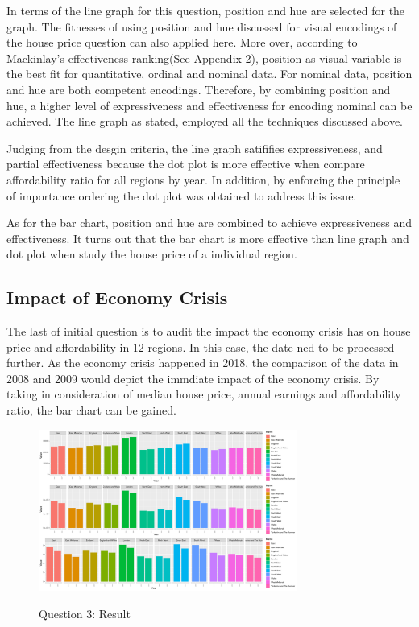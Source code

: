 \documentclass{article}
\begin{document}
In terms of the line graph for this question, position and hue are selected for the graph. The fitnesses of 
using position and hue discussed for visual encodings of the house price question can also applied here. 
More over, according to Mackinlay's effectiveness ranking(See Appendix 2)\cite{MackinlayJock1986Atdo}, 
position as visual variable is the best fit for quantitative, ordinal and nominal data. For nominal data, 
position and hue are both competent encodings. Therefore, by combining position and hue, a higher level of 
expressiveness and effectiveness for encoding nominal can be achieved. The line graph as stated, employed 
all the techniques discussed above. 

Judging from the desgin criteria, the line graph satififies expressiveness, and partial effectiveness because 
the dot plot is more effective when compare affordability ratio for all regions by year. In addition, by enforcing 
the principle of importance ordering the dot plot was obtained to address this issue.

As for the bar chart, position and hue are combined to achieve expressiveness and effectiveness. It turns out 
that the bar chart is more effective than line graph and dot plot when study the house price of a individual region.


\subsection{Impact of Economy Crisis}
The last of initial question is to audit the impact the economy crisis has on house price and affordability
in 12 regions. In this case, the date ned to be processed further. As the economy crisis happened in 2018, 
the comparison of the data in 2008 and 2009 would depict the immdiate impact of the economy crisis. By taking 
in consideration of median house price, annual earnings and affordability ratio, the bar chart can be gained.

\begin{figure}[H]
  \begin{minipage}[b]{1.0\linewidth}
    \centering
    \centerline{\includegraphics[width=8.5cm]{Q3Geom_gridbar}}
    \centerline{Question 3: Result}\medskip
  \end{minipage}
\end{figure}
\end{document}
